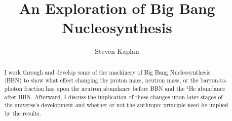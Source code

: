\documentclass[aps,reprint,prl]{revtex4-1}
\begin{document}
\title{An Exploration of Big Bang Nucleosynthesis}
\author{Steven Kaplan}

\begin{abstract}
I work through and develop some of the machinery of Big Bang Nucleosynthesis (BBN) to show what effect changing the proton mass, neutron mass, or the baryon-to-photon fraction has upon the neutron abundance before BBN and the $^4$He abundance after BBN.  Afterward, I discuss the implication of these changes upon later stages of the universe's development and whether or not the anthropic principle need be implied by the results.
\end{abstract}

\maketitle
\nocite{*} %
\end{document}
